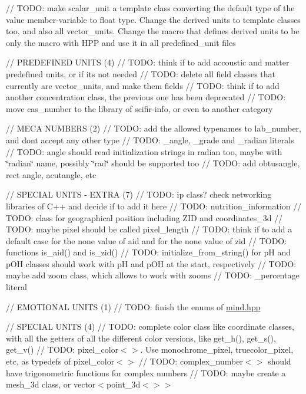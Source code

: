 // TODO\+: make scalar\+\_\+unit a template class converting the default type of the value member-\/variable to float type. Change the derived units to template classes too, and also all vector\+\_\+units. Change the macro that defines derived units to be only the macro with HPP and use it in all predefined\+\_\+unit files

// PREDEFINED UNITS (4) // TODO\+: think if to add accoustic and matter predefined units, or if it\textquotesingle{}s not needed // TODO\+: delete all field classes that currently are vector\+\_\+units, and make them fields // TODO\+: think if to add another concentration class, the previous one has been deprecated // TODO\+: move cas\+\_\+number to the library of scifir-\/info, or even to another category

// MECA NUMBERS (2) // TODO\+: add the allowed typenames to lab\+\_\+number, and don\textquotesingle{}t accept any other type // TODO\+: \+\_\+angle, \+\_\+grade and \+\_\+radian literals // TODO\+: angle should read initialization strings in radian too, maybe with \char`\"{}radian\char`\"{} name, possibly \char`\"{}rad\char`\"{} should be supported too // TODO\+: add obtusangle, rect angle, acutangle, etc

// SPECIAL UNITS -\/ EXTRA (7) // TODO\+: ip class? check networking libraries of C++ and decide if to add it here // TODO\+: nutrition\+\_\+information // TODO\+: class for geographical position including ZID and coordinates\+\_\+3d // TODO\+: maybe pixel should be called pixel\+\_\+length // TODO\+: think if to add a default case for the none value of aid and for the none value of zid // TODO\+: functions is\+\_\+aid() and is\+\_\+zid() // TODO\+: initialize\+\_\+from\+\_\+string() for pH and p\+OH classes should work with pH and p\+OH at the start, respectively // TODO\+: maybe add zoom class, which allows to work with zooms // TODO\+: \+\_\+percentage literal

// EMOTIONAL UNITS (1) // TODO\+: finish the enums of \mbox{\hyperlink{mind_8hpp}{mind.\+hpp}}

// SPECIAL UNITS (4) // TODO\+: complete color class like coordinate classes, with all the getters of all the different color versions, like get\+\_\+h(), get\+\_\+s(), get\+\_\+v() // TODO\+: pixel\+\_\+color$<$$>$. Use monochrome\+\_\+pixel, truecolor\+\_\+pixel, etc, as typedefs of pixel\+\_\+color$<$$>$ // TODO\+: complex\+\_\+number$<$$>$ should have trigonometric functions for complex numbers // TODO\+: maybe create a mesh\+\_\+3d class, or vector$<$point\+\_\+3d$<$$>$$>$

